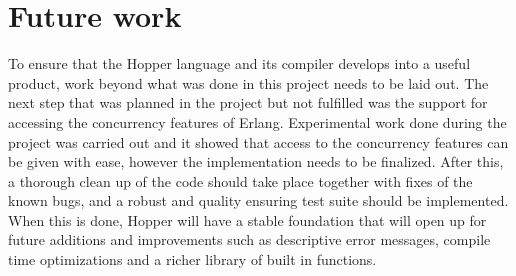 \section{Future work}

To ensure that the Hopper language and its compiler develops into a useful product, work beyond what was done in this project needs to be laid out. The next step that was planned in the project but not fulfilled was the support for accessing the concurrency features of Erlang. Experimental work done during the project was carried out and it showed that access to the concurrency features can be given with ease, however the implementation needs to be finalized. After this, a thorough clean up of the code should take place together with fixes of the known bugs, and a robust and quality ensuring test suite should be implemented. When this is done, Hopper will have a stable foundation that will open up for future additions and improvements such as descriptive error messages, compile time optimizations and a richer library of built in functions.
